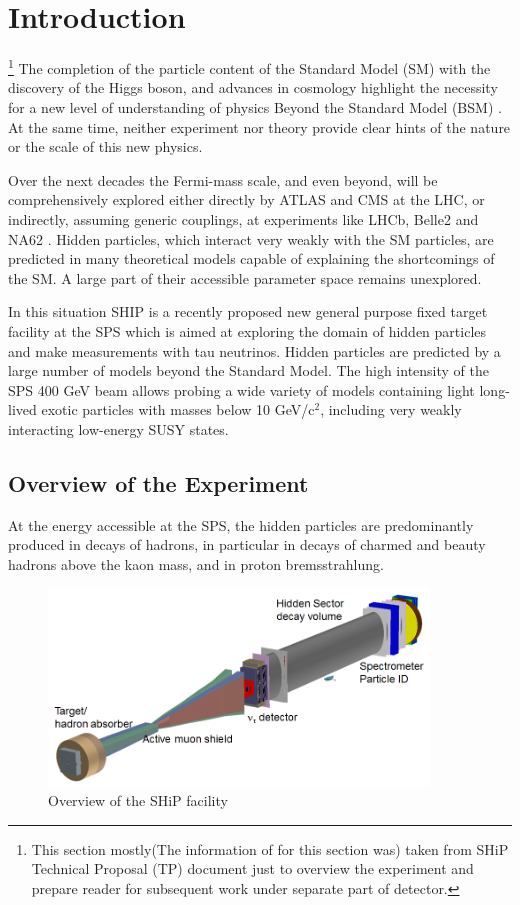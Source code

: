 
\section{Introduction}

	\footnote{This section mostly(The information of for this section was) taken from SHiP Technical Proposal (TP) document \cite{ship_TP} just to overview the experiment and prepare reader for subsequent work under separate part of detector.}
	The completion of the particle content of the Standard Model (SM) with the discovery of the Higgs boson, and advances in cosmology highlight the necessity for a new level of understanding of physics Beyond the Standard Model (BSM) . At the same time, neither experiment nor theory provide clear hints of the nature or the scale of this new physics.

	Over the next decades the Fermi-mass scale, and even beyond, will be comprehensively  explored either directly by ATLAS and CMS at the LHC, or indirectly, assuming generic couplings, at experiments like LHCb, Belle2 and NA62 \cite{NA62_TDR}. Hidden particles, which interact very weakly with the SM particles, are predicted in many theoretical models capable of explaining the shortcomings of the SM. A large part of their accessible parameter space remains unexplored.

	In this situation SHIP is a recently proposed new general purpose fixed target facility at the SPS which is aimed at exploring the domain of hidden particles and make measurements with tau neutrinos. Hidden particles are predicted by a large number of models beyond the Standard Model. The high intensity of the SPS 400 GeV beam allows probing a wide variety of models containing light long-lived exotic particles with masses below 10 GeV/c$^2$, including very weakly interacting low-energy SUSY states.
	
		
	\subsection{Overview of the Experiment}
	At the energy accessible at the SPS, the hidden particles are predominantly produced in decays of hadrons, in particular in decays of charmed and beauty hadrons above the kaon mass, and in proton bremsstrahlung.

	\begin{figure}[!h]
	\centering
	\includegraphics[width=0.9\textwidth]{introduction/SHiP-facility-overview}
	\caption{Overview of the SHiP facility \cite{ship_TP} }
	\label{fig:detector-overwiew}
	\end{figure}
	
